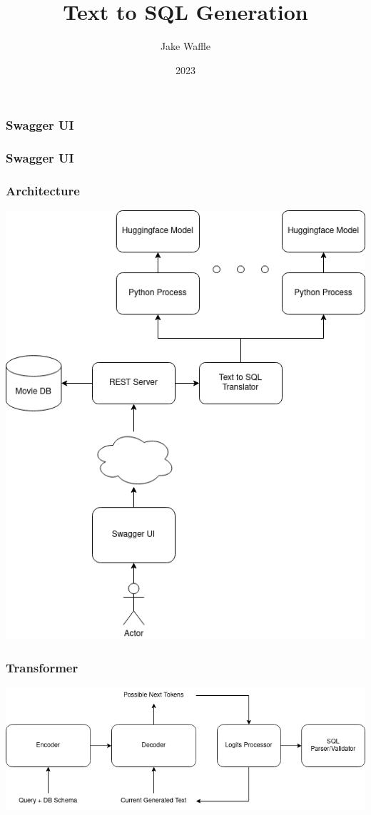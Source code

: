 \documentclass{beamer}
\title{Text to SQL Generation}
\author{Jake Waffle}
\date{2023}
\begin{document}
\frame{\titlepage}

\begin{frame}
\frametitle{Swagger UI}


\end{frame}

\begin{frame}
\frametitle{Swagger UI}


\end{frame}


\begin{frame}
\frametitle{Architecture}

\includegraphics[scale=0.4]{demo-architecture.drawio.png}

\end{frame}

\begin{frame}
\frametitle{Transformer}

\includegraphics[scale=0.45]{t5-transformer.drawio.png}

\end{frame}
\end{document}
